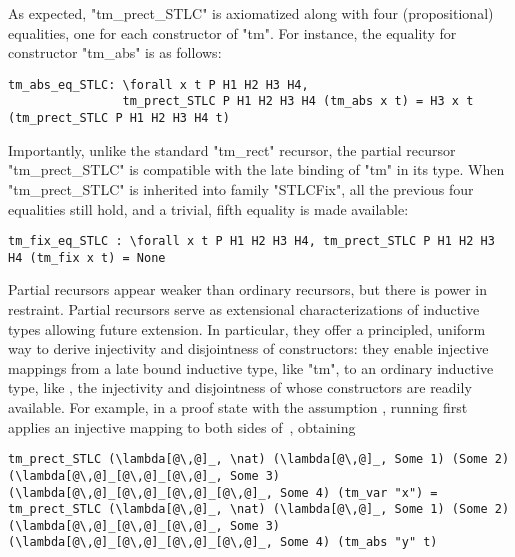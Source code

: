 \noindent
As expected, "tm_prect_STLC" is axiomatized along with
four (propositional) equalities, one for each constructor of "tm".
For instance, the equality for constructor "tm_abs" is as follows:

\begin{centered}
\begin{minipage}{\textwidth}
\begin{lstlisting}[basicstyle=\fontsize{8.25}{9}\ttfamily]
tm_abs_eq_STLC: \forall x t P H1 H2 H3 H4,
                tm_prect_STLC P H1 H2 H3 H4 (tm_abs x t) = H3 x t (tm_prect_STLC P H1 H2 H3 H4 t)
\end{lstlisting}
\end{minipage}
\end{centered}

Importantly, unlike the standard "tm_rect" recursor, the partial recursor
"tm_prect_STLC" is compatible with the late binding of "tm" in its type.
When "tm_prect_STLC" is inherited into family "STLCFix", all the previous four equalities
still hold, and a trivial, fifth equality is made available:

\begin{centered}
\begin{minipage}{.88\textwidth}
\begin{lstlisting}[basicstyle=\fontsize{8.25}{9}\ttfamily]
tm_fix_eq_STLC : \forall x t P H1 H2 H3 H4, tm_prect_STLC P H1 H2 H3 H4 (tm_fix x t) = None
\end{lstlisting}
\end{minipage}
\end{centered}

Partial recursors appear weaker than ordinary recursors,
but there is power in restraint.
Partial recursors serve as extensional characterizations of inductive types allowing future extension.
In particular,
they offer a principled, uniform way to derive injectivity and disjointness of
constructors:
they enable injective mappings from a late bound inductive
type, like "tm", to an ordinary inductive type, like \lsti{\nat},
the injectivity and disjointness of whose constructors are readily
available.
%
For example, in a proof state with the assumption ,
running  first applies an injective mapping to
both sides of~, obtaining

\begin{centered}
\begin{minipage}{.98\textwidth}
\begin{lstlisting}[basicstyle=\fontsize{8.25}{9}\ttfamily]
tm_prect_STLC (\lambda[@\,@]_, \nat) (\lambda[@\,@]_, Some 1) (Some 2) (\lambda[@\,@]_[@\,@]_[@\,@]_, Some 3) (\lambda[@\,@]_[@\,@]_[@\,@]_[@\,@]_, Some 4) (tm_var "x") =
tm_prect_STLC (\lambda[@\,@]_, \nat) (\lambda[@\,@]_, Some 1) (Some 2) (\lambda[@\,@]_[@\,@]_[@\,@]_, Some 3) (\lambda[@\,@]_[@\,@]_[@\,@]_[@\,@]_, Some 4) (tm_abs "y" t)
\end{lstlisting}
\end{minipage}
\end{centered}

